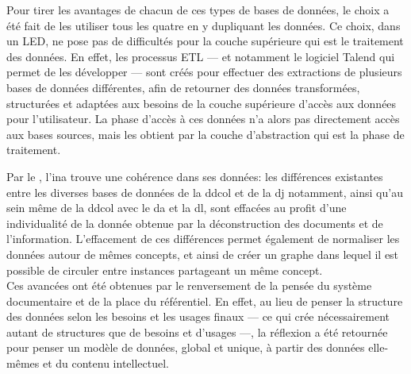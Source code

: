 Pour tirer les avantages de chacun de ces types de bases de données, le choix a été fait de les utiliser tous les quatre en y dupliquant les données. Ce choix, dans un LED, ne pose pas de difficultés pour la couche supérieure qui est le traitement des données. En effet, les processus ETL --- et notamment le logiciel Talend qui permet de les développer --- sont créés pour effectuer des extractions de plusieurs bases de données différentes, afin de retourner des données transformées, structurées et adaptées aux besoins de la couche supérieure d'accès aux données pour l'utilisateur. La phase d'accès à ces données n'a alors pas directement accès aux bases sources, mais les obtient par la couche d'abstraction qui est la phase de traitement.

\bigskip
\bigskip

Par le \ldd, l'\ac{ina} trouve une cohérence dans ses données: les différences existantes entre les diverses bases de données de la \ac{ddcol} et de la \ac{dj} notamment, ainsi qu'au sein même de la \ac{ddcol} avec le \ac{da} et la \ac{dl}, sont effacées au profit d'une individualité de la donnée obtenue par la déconstruction des documents et de l'information. L'effacement de ces différences permet également de normaliser les données autour de mêmes concepts, et ainsi de créer un graphe dans lequel il est possible de circuler entre instances partageant un même concept.\\

Ces avancées ont été obtenues par le renversement de la pensée du système documentaire et de la place du référentiel. En effet, au lieu de penser la structure des données selon les besoins et les usages finaux --- ce qui crée nécessairement autant de structures que de besoins et d'usages ---, la réflexion a été retournée pour penser un modèle de données, global et unique, à partir des données elle-mêmes et du contenu intellectuel.